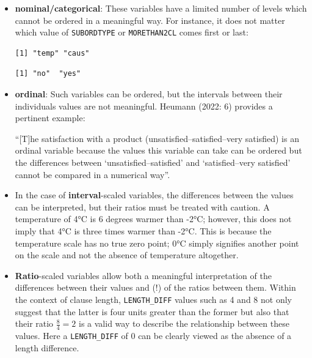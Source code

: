 \documentclass[
  11pt,
  letterpaper,
  DIV=11,
  numbers=noendperiod]{scrreprt}
\newenvironment{Shaded}{\begin{snugshade}}{\end{snugshade}}
\newcommand{\FunctionTok}[1]{\textcolor[rgb]{0.28,0.35,0.67}{#1}}
\newcommand{\NormalTok}[1]{\textcolor[rgb]{0.00,0.23,0.31}{#1}}
\newcommand{\SpecialCharTok}[1]{\textcolor[rgb]{0.37,0.37,0.37}{#1}}
\begin{document}
\begin{itemize}
\item
  \textbf{nominal/categorical}: These variables have a limited number of
  levels which cannot be ordered in a meaningful way. For instance, it
  does not matter which value of \texttt{SUBORDTYPE} or
  \texttt{MORETHAN2CL} comes first or last:

\begin{Shaded}
\end{Shaded}

\begin{verbatim}
[1] "temp" "caus"
\end{verbatim}

\begin{Shaded}
\end{Shaded}

\begin{verbatim}
[1] "no"  "yes"
\end{verbatim}
\item
  \textbf{ordinal}: Such variables can be ordered, but the intervals
  between their individuals values are not meaningful. Heumann (2022: 6)
  provides a pertinent example:

  ``{[}T{]}he satisfaction with a product (unsatisfied--satisfied--very
  satisfied) is an ordinal variable because the values this variable can
  take can be ordered but the differences between
  `unsatisfied--satisfied' and `satisfied--very satisfied' cannot be
  compared in a numerical way''.
\item
  In the case of \textbf{interval}-scaled variables, the differences
  between the values can be interpreted, but their ratios must be
  treated with caution. A temperature of 4°C is 6 degrees warmer than
  -2°C; however, this does not imply that 4°C is three times warmer than
  -2°C. This is because the temperature scale has no true zero point;
  0°C simply signifies another point on the scale and not the absence of
  temperature altogether.
\item
  \textbf{Ratio}-scaled variables allow both a meaningful interpretation
  of the differences between their values and (!) of the ratios between
  them. Within the context of clause length, \texttt{LENGTH\_DIFF}
  values such as 4 and 8 not only suggest that the latter is four units
  greater than the former but also that their ratio \(\frac{8}{4} = 2\)
  is a valid way to describe the relationship between these values. Here
  a \texttt{LENGTH\_DIFF} of 0 can be clearly viewed as the absence of a
  length difference.
\end{itemize}
\end{document}
